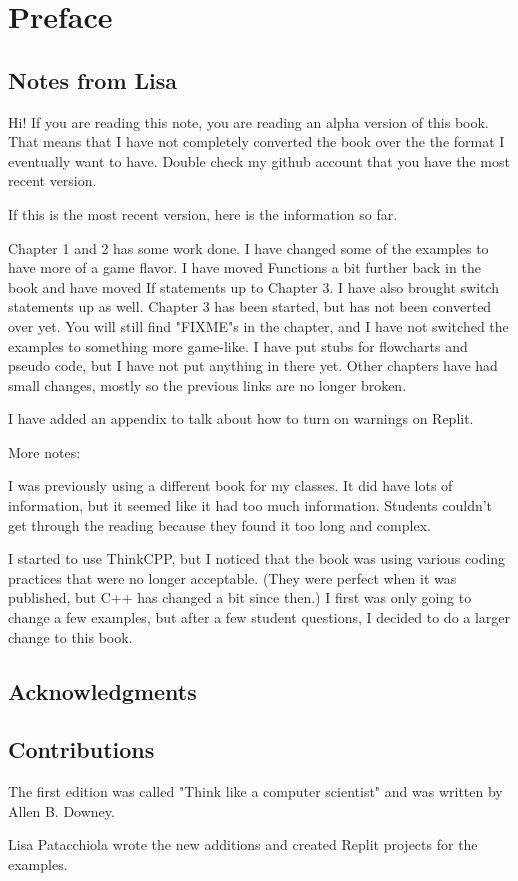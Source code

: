 
\chapter{Preface}

\section{Notes from Lisa}
Hi! If you are reading this note, you are reading an alpha version of this book. That means that I have not completely converted the book over the the format I eventually want to have. Double check my github account that you have the most recent version.

If this is the most recent version, here is the information so far.

Chapter 1 and 2 has some work done. I have changed some of the examples to have more of a game flavor. I have moved Functions a bit further back in the book and have moved If statements up to Chapter 3. I have also brought switch statements up as well. Chapter 3 has been started, but has not been converted over yet. You will still find "FIXME"s in the chapter, and I have not switched the examples to something more game-like. I have put stubs for flowcharts and pseudo code, but I have not put anything in there yet. Other chapters have had small changes, mostly so the previous links are no longer broken.

I have added an appendix to talk about how to turn on warnings on Replit.


More notes:

I was previously using a different book for my classes. It did have lots of information, but it seemed like it had too much information. Students couldn't get through the reading because they found it too long and complex.

I started to use ThinkCPP, but I noticed that the book was using various coding practices that were no longer acceptable. (They were perfect when it was published, but C++ has changed a bit since then.) I first was only going to change a few examples, but after a few student questions, I decided to do a larger change to this book.


\section{Acknowledgments}

\section{Contributions}
The first edition was called "Think like a computer scientist" and was written by Allen B. Downey. 

Lisa Patacchiola wrote the new additions and created Replit projects for the examples. 


